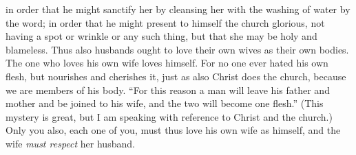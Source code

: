 \begin{biblechapter}
\verse in order that he might sanctify her by cleansing her with the washing of water by the word;
\verse in order that he might present to himself the church glorious, not having a spot or wrinkle or any such thing, but that she may be holy and blameless.
\verse Thus also husbands ought to love their own wives as their own bodies. The one who loves his own wife loves himself.
\verse For no one ever hated his own flesh, but nourishes and cherishes it, just as also Christ does the church,
\verse because we are members of his body.
\verse “For this reason a man will leave his father and mother and be joined to his wife, and the two will become one flesh.”
\verse (This mystery is great, but I am speaking with reference to Christ and the church.)
\verse Only you also, each one of you, must thus love his own wife as himself, and the wife \textit{must respect} her husband.
\end{biblechapter}


